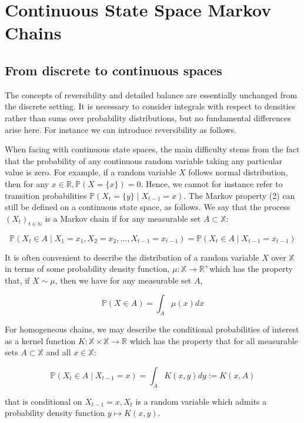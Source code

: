 \documentclass[10pt]{article}
\begin{document}
\section{Continuous State Space Markov Chains}
\subsection{From discrete to continuous spaces}
The concepts of reversibility and detailed balance are essentially unchanged from the discrete setting. It is necessary to consider integrals with respect to densities rather than sums over probability distributions, but no fundamental differences arise here. For instance we can introduce reversibility as follows.


When facing with continuous state spaces, the main difficulty stems from the fact that the probability of any continuous random variable taking any particular value is zero. For example, if a random variable $X$ follows normal distribution, then for any $x \in \mathbb{R}, \mathbb{P}(X=\{x\})=0$. Hence, we cannot for instance refer to transition probabilities $\mathbb{P}\left(X_{t}=\{y\} \mid X_{t-1}=x\right)$. The Markov property (2) can still be defined on a continuous state space, as follows. We say that the process $\left(X_{t}\right)_{t \in \mathbb{N}}$ is a Markov chain if for any measurable set $A \subset \mathbb{X}:$

$$
\mathbb{P}\left(X_{t} \in A \mid X_{1}=x_{1}, X_{2}=x_{2}, \ldots, X_{t-1}=x_{t-1}\right)=\mathbb{P}\left(X_{t} \in A \mid X_{t-1}=x_{t-1}\right)
$$

It is often convenient to describe the distribution of a random variable $X$ over $\mathbb{X}$ in terms of some probability density function, $\mu: \mathbb{X} \rightarrow \mathbb{R}^{+}$which has the property that, if $X \sim \mu$, then we have for any measurable set $A$,

$$
\mathbb{P}(X \in A)=\int_{A} \mu(x) d x
$$

For homogeneous chains, we may describe the conditional probabilities of interest as a kernel function $K: \mathbb{X} \times \mathbb{X} \rightarrow \mathbb{R}$ which has the property that for all measurable sets $A \subset \mathbb{X}$ and all $x \in \mathbb{X}:$

$$
\mathbb{P}\left(X_{t} \in A \mid X_{t-1}=x\right)=\int_{A} K(x, y) d y:=K(x, A)
$$

that is conditional on $X_{t-1}=x, X_{t}$ is a random variable which admits a probability density function $y \mapsto K(x, y)$.
\end{document}
